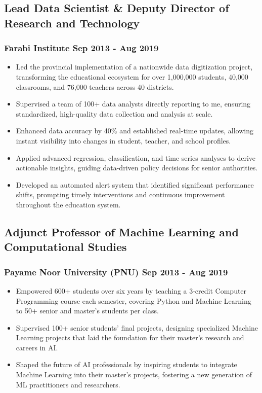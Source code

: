 \documentclass[11pt]{article} %
\begin{document}
\subsection{Lead Data Scientist \& Deputy Director of Research and Technology}
\subsubsection{Farabi Institute \hfill Sep 2013 - Aug 2019}
\begin{itemize}
	\item Led the provincial implementation of a nationwide data digitization project, transforming the educational ecosystem for over 1,000,000 students, 40,000 classrooms, and 76,000 teachers across 40 districts.
	\item Supervised a team of 100+ data analysts directly reporting to me, ensuring standardized, high-quality data collection and analysis at scale. 
	\item Enhanced data accuracy by 40\% and established real-time updates, allowing instant visibility into changes in student, teacher, and school profiles.
	\item Applied advanced regression, classification, and time series analyses to derive actionable insights, guiding data-driven policy decisions for senior authorities.
	\item Developed an automated alert system that identified significant performance shifts, prompting timely interventions and continuous improvement throughout the education system.
\end{itemize}

\subsection{Adjunct Professor of Machine Learning and Computational Studies}
\subsubsection{Payame Noor University (PNU) \hfill Sep 2013 - Aug 2019}
\begin{itemize}
	\item Empowered 600+ students over six years by teaching a 3-credit Computer Programming course each semester, covering Python and Machine Learning to 50+ senior and master's students per class.
	\item Supervised 100+ senior students' final projects, designing specialized Machine Learning projects that laid the foundation for their master's research and careers in AI.
	\item Shaped the future of AI professionals by inspiring students to integrate Machine Learning into their master's projects, fostering a new generation of ML practitioners and researchers.
\end{itemize}
\end{document}
